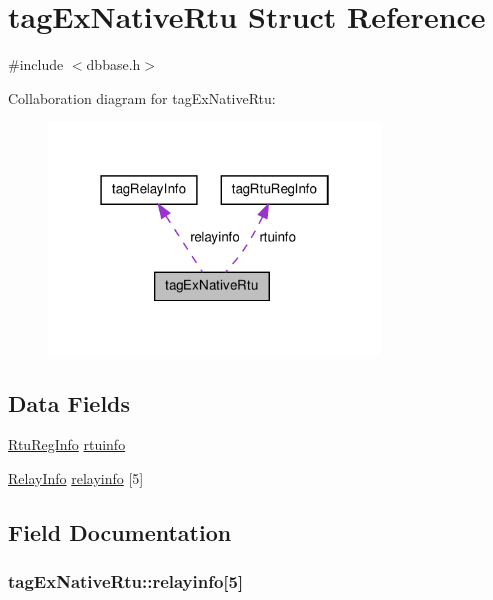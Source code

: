 \hypertarget{structtagExNativeRtu}{\section{tag\-Ex\-Native\-Rtu Struct Reference}
\label{structtagExNativeRtu}
}


{\ttfamily \#include $<$dbbase.\-h$>$}



Collaboration diagram for tag\-Ex\-Native\-Rtu\-:\nopagebreak
\begin{figure}[H]
\begin{center}
\leavevmode
\includegraphics[width=250pt]{structtagExNativeRtu__coll__graph}
\end{center}
\end{figure}
\subsection*{Data Fields}
\begin{DoxyCompactItemize}
\item 
\hyperlink{dbbase_8h_a4f06859d090e81c1be0c142757ce6e11}{Rtu\-Reg\-Info} \hyperlink{structtagExNativeRtu_a1bf748b58223237175f02b7451675f81}{rtuinfo}
\item 
\hyperlink{dbbase_8h_a0b03d4572aa748e31ba159ba4f9a647d}{Relay\-Info} \hyperlink{structtagExNativeRtu_a51ae10d71fc9da0210384ddb019d6c7c}{relayinfo} \mbox{[}5\mbox{]}
\end{DoxyCompactItemize}


\subsection{Field Documentation}
\hypertarget{structtagExNativeRtu_a51ae10d71fc9da0210384ddb019d6c7c}{
\subsubsection[{relayinfo}]{ tag\-Ex\-Native\-Rtu\-::relayinfo\mbox{[}5\mbox{]}}}\label{structtagExNativeRtu_a51ae10d71fc9da0210384ddb019d6c7c}


